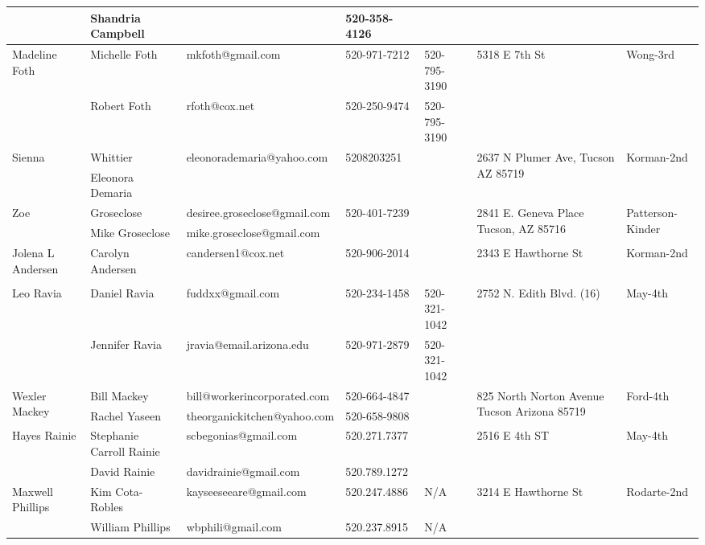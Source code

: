 \documentclass[landscape]{book}\usepackage[]{graphicx}\usepackage[]{color}
\begin{document}
\begin{longtable}{p{70pt}|p{75pt}|p{120pt}|p{60pt}|p{60pt}|p{100pt}|p{70pt}|}
 & Shandria Campbell  &  & 520-358-4126 &  & & \\
\hline
\multirow{2}{70pt}{Madeline Foth} & Michelle Foth & mkfoth@gmail.com & 520-971-7212 & 520-795-3190 & \multirow{2}{100pt}{5318 E 7th St} & \multirow{2}{70pt}{Wong-3rd}\\
 & Robert Foth & rfoth@cox.net & 520-250-9474 & 520-795-3190 & & \\
\hline
\multirow{2}{70pt}{Sienna} & Whittier & eleonorademaria@yahoo.com & 5208203251 &  & \multirow{2}{100pt}{2637 N Plumer Ave, Tucson AZ 85719} & \multirow{2}{70pt}{Korman-2nd}\\
 & Eleonora Demaria &  &  &  & & \\
\hline
\multirow{2}{70pt}{Zoe} & Groseclose & desiree.groseclose@gmail.com & 520-401-7239 &  & \multirow{2}{100pt}{2841 E. Geneva Place Tucson, AZ 85716} & \multirow{2}{70pt}{Patterson-Kinder}\\
 & Mike Groseclose & mike.groseclose@gmail.com &  &  & & \\
\hline
\multirow{2}{70pt}{Jolena L Andersen} & Carolyn Andersen & candersen1@cox.net & 520-906-2014 &  & \multirow{2}{100pt}{2343 E Hawthorne St} & \multirow{2}{70pt}{Korman-2nd}\\
 &  &  &  &  & & \\
\hline
\multirow{2}{70pt}{Leo Ravia} & Daniel Ravia & fuddxx@gmail.com & 520-234-1458 & 520-321-1042 & \multirow{2}{100pt}{2752 N. Edith Blvd. (16)} & \multirow{2}{70pt}{May-4th}\\
 & Jennifer Ravia & jravia@email.arizona.edu & 520-971-2879 & 520-321-1042 & & \\
\hline
\multirow{2}{70pt}{Wexler Mackey} & Bill Mackey & bill@workerincorporated.com & 520-664-4847 &  & \multirow{2}{100pt}{825 North Norton Avenue Tucson Arizona 85719} & \multirow{2}{70pt}{Ford-4th}\\
 & Rachel Yaseen & theorganickitchen@yahoo.com & 520-658-9808 &  & & \\
\hline
\multirow{2}{70pt}{Hayes Rainie} & Stephanie Carroll Rainie & scbegonias@gmail.com & 520.271.7377 &  & \multirow{2}{100pt}{2516 E 4th ST} & \multirow{2}{70pt}{May-4th}\\
 & David Rainie & davidrainie@gmail.com & 520.789.1272 &  & & \\
\hline
\multirow{2}{70pt}{Maxwell Phillips} & Kim Cota-Robles & kayseeseeare@gmail.com & 520.247.4886 & N/A & \multirow{2}{100pt}{3214 E Hawthorne St} & \multirow{2}{70pt}{Rodarte-2nd}\\
 & William Phillips & wbphili@gmail.com & 520.237.8915 & N/A & & \\

\end{longtable}
\end{document}
